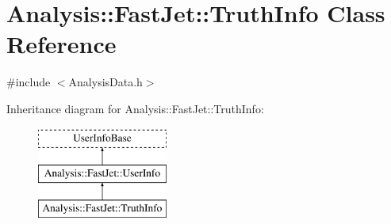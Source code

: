 \hypertarget{classAnalysis_1_1FastJet_1_1TruthInfo}{}\section{Analysis\+:\+:Fast\+Jet\+:\+:Truth\+Info Class Reference}
\label{classAnalysis_1_1FastJet_1_1TruthInfo}


{\ttfamily \#include $<$Analysis\+Data.\+h$>$}

Inheritance diagram for Analysis\+:\+:Fast\+Jet\+:\+:Truth\+Info\+:\begin{figure}[H]
\begin{center}
\leavevmode
\includegraphics[height=3.000000cm]{classAnalysis_1_1FastJet_1_1TruthInfo}
\end{center}
\end{figure}
